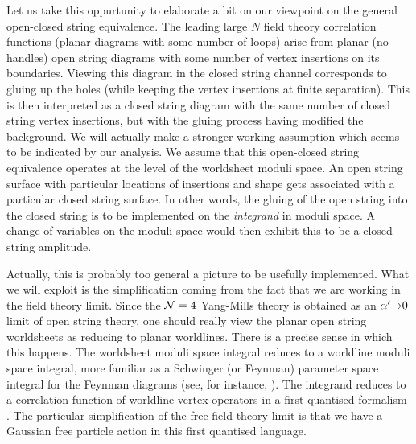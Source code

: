 Let us take this oppurtunity to elaborate a bit 
on our viewpoint on the general open-closed string equivalence. 
The leading large $N$ 
field theory
correlation functions (planar diagrams with some number of loops)
arise from planar (no handles) open string diagrams with some number of vertex 
insertions 
on its boundaries. Viewing this diagram in the closed string channel corresponds to 
gluing up the holes (while keeping the vertex insertions at finite separation). This is then 
interpreted as a closed string diagram with the same number of 
closed string vertex insertions, but with the gluing process having modified the background.
We will actually 
make a stronger working assumption which seems to be indicated by our analysis. 
We assume that this
open-closed string equivalence operates at the level of the worldsheet moduli space. 
An open string surface with particular locations of insertions and shape gets
associated with a particular closed string surface. In other words, the 
gluing of the open string into the closed string is to be implemented on the {\it integrand} 
in moduli space. A change of variables on the moduli space would then exhibit this to be 
a closed string amplitude. 

Actually, this is probably too general a picture to be usefully implemented. What we will 
exploit is the simplification coming from the fact that we are working in the 
field theory limit. 
Since the ${\cal N}=4$ Yang-Mills theory is obtained as an $\alpha^{\prime}{\rightarrow} 0$
limit of open string theory, one should really view the planar open string worldsheets
as reducing to planar worldlines. There is a precise sense in which this happens. The worldsheet
moduli space integral reduces to a worldline moduli space integral, 
more familiar as a Schwinger (or Feynman) parameter space integral for the Feynman 
diagrams (see, for instance, \berkos\divec\fmr ). The integrand reduces to 
a correlation function of worldline vertex operators in a first quantised formalism \polbk\strass . 
The particular simplification of the free field theory limit 
is that we have a Gaussian free particle action in this first quantised language.

